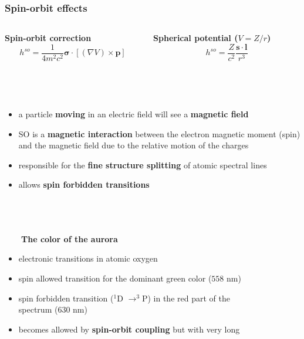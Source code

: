\documentclass[mathserif,8pt]{beamer}
\begin{document}
\begin{frame}
    \frametitle{Spin-orbit effects}
    \begin{columns}
    \begin{column}{.70\textwidth}
    \begin{columns}
    \begin{column}{.28\textwidth}
	\centering
	\textbf{Spin-orbit correction}
	\begin{equation}
	    \nonumber
	    h^{so} = \frac{1}{4m^2c^2}\boldsymbol{\sigma}\cdot
		\left[\left(\nabla V\right)\times\boldsymbol{p}\right]
	\end{equation}
    \end{column}
    \begin{column}{.42\textwidth}
	\centering
	\textbf{Spherical potential ($V=Z/r$)}
	\begin{equation}
	    \nonumber
	    h^{so} = \frac{Z}{c^2}\frac{\boldsymbol{s}\cdot\boldsymbol{l}}{r^3}
	\end{equation}
    \end{column}
    \end{columns}
    \ \\
    \ \\
    \begin{itemize}
	\item	a particle \textbf{moving} in an electric field will see a \textbf{magnetic field}
	\item	SO is a \textbf{magnetic interaction} between the electron magnetic moment
		(spin) and the magnetic field due to the relative motion of the charges
	\item	responsible for the \textbf{fine structure splitting} of atomic spectral lines
	\item	allows \textbf{spin forbidden transitions}
    \end{itemize}
    \ \\
    \ \\
    \ \\
    \pause
    \ \ \ \ \textbf{The color of the aurora}
    \begin{itemize}
	\item	electronic transitions in atomic oxygen
        \item   spin allowed transition for the dominant green color ($558$ nm)
        \item   spin forbidden transition ($^1$D $\rightarrow ^3$P) in the red part of the\\ 
		spectrum ($630$ nm)
        \item   becomes allowed by \textbf{spin-orbit coupling} but with very long\\

\end{itemize}
\end{column}
\end{columns}
\end{frame}
\end{document}
